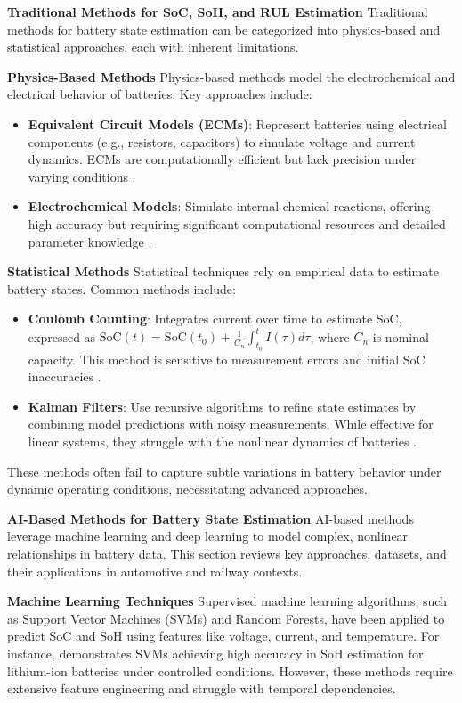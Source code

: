 \textbf{Traditional Methods for SoC, SoH, and RUL Estimation}
Traditional methods for battery state estimation can be categorized into physics-based and statistical approaches, each with inherent limitations.

\textbf{Physics-Based Methods}
Physics-based methods model the electrochemical and electrical behavior of batteries. Key approaches include:
\begin{itemize}
    \item \textbf{Equivalent Circuit Models (ECMs)}: Represent batteries using electrical components (e.g., resistors, capacitors) to simulate voltage and current dynamics. ECMs are computationally efficient but lack precision under varying conditions \cite{Ref5}.
    \item \textbf{Electrochemical Models}: Simulate internal chemical reactions, offering high accuracy but requiring significant computational resources and detailed parameter knowledge \cite{Ref5}.
\end{itemize}

\textbf{Statistical Methods}
Statistical techniques rely on empirical data to estimate battery states. Common methods include:
\begin{itemize}
    \item \textbf{Coulomb Counting}: Integrates current over time to estimate SoC, expressed as \( \text{SoC}(t) = \text{SoC}(t_0) + \frac{1}{C_n} \int_{t_0}^t I(\tau) d\tau \), where \( C_n \) is nominal capacity. This method is sensitive to measurement errors and initial SoC inaccuracies \cite{Report}.
    \item \textbf{Kalman Filters}: Use recursive algorithms to refine state estimates by combining model predictions with noisy measurements. While effective for linear systems, they struggle with the nonlinear dynamics of batteries \cite{Report}.
\end{itemize}

These methods often fail to capture subtle variations in battery behavior under dynamic operating conditions, necessitating advanced approaches.

\textbf{AI-Based Methods for Battery State Estimation}
AI-based methods leverage machine learning and deep learning to model complex, nonlinear relationships in battery data. This section reviews key approaches, datasets, and their applications in automotive and railway contexts.

\textbf{Machine Learning Techniques}
Supervised machine learning algorithms, such as Support Vector Machines (SVMs) and Random Forests, have been applied to predict SoC and SoH using features like voltage, current, and temperature. For instance, \cite{Ref5} demonstrates SVMs achieving high accuracy in SoH estimation for lithium-ion batteries under controlled conditions. However, these methods require extensive feature engineering and struggle with temporal dependencies.

